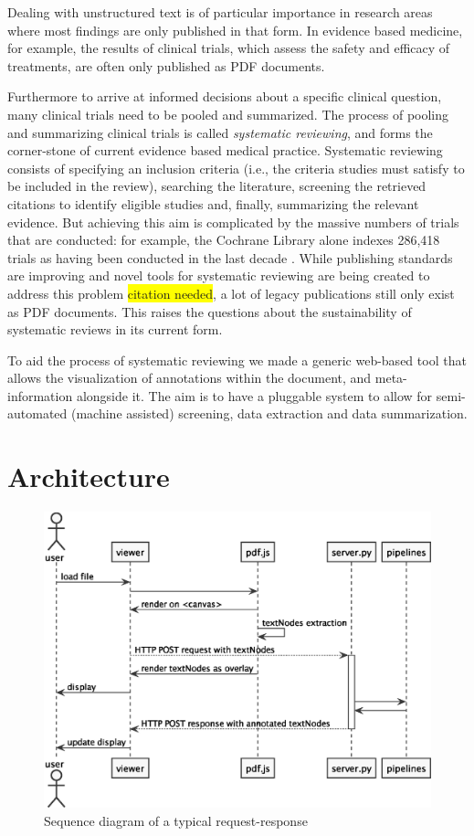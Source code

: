 \documentclass[runningheads,a4paper]{llncs}
\newcommand{\highlight}[1]{\colorbox{yellow}{#1}}
\begin{document}
Dealing with unstructured text is of particular importance in research areas where most findings are only published in that form.
In evidence based medicine, for example, the results of clinical trials, which assess the safety and efficacy of treatments, are often only published as PDF documents.

Furthermore to arrive at informed decisions about a specific clinical question, many clinical trials need to be pooled and summarized.
The process of pooling and summarizing clinical trials is called \emph{systematic reviewing}, and forms the corner-stone of current evidence based medical practice.
Systematic reviewing consists of specifying an inclusion criteria (i.e., the criteria studies must satisfy to be included in the review), searching the literature, screening the retrieved citations to identify eligible studies and, finally, summarizing the relevant evidence.
But achieving this aim is complicated by the massive numbers of trials that are conducted: for example, the Cochrane Library alone indexes 286,418 trials as having been conducted in the last decade \cite{valkenhoef2012}.
While publishing standards are improving and novel tools for systematic reviewing are being created to address this problem \highlight{citation needed}, a lot of legacy publications still only exist as PDF documents.
This raises the questions about the sustainability of systematic reviews in its current form.

To aid the process of systematic reviewing we made a generic web-based tool that allows the visualization of annotations within the document, and meta-information alongside it.
The aim is to have a pluggable system to allow for semi-automated (machine assisted) screening, data extraction and data summarization.
\section{Architecture}
\label{sec-2}
\begin{figure}[htb]
\centering
\includegraphics[width=.9\linewidth]{./diagrams//sequence.eps}
\caption{\label{fig:sequence}Sequence diagram of a typical request-response}
\end{figure}
\end{document}

